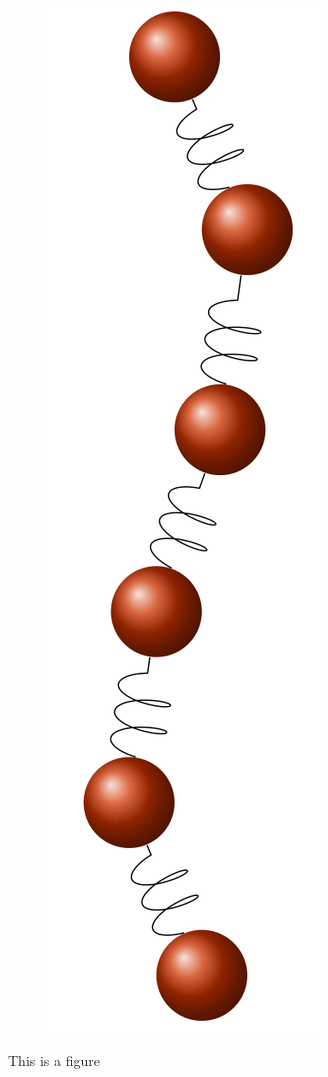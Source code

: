 \begin{figure}[ht]
\begin{centering}
\begin{subfigure}[t]{\dimexpr.25\linewidth-1.3em\relax}
  \includegraphics[width=.5\linewidth,valign=t]{Figures/beadSpring.png}
  \end{subfigure}
  \caption{This is a figure}
  \label{fig:test}
  \end{centering}
\end{figure}
